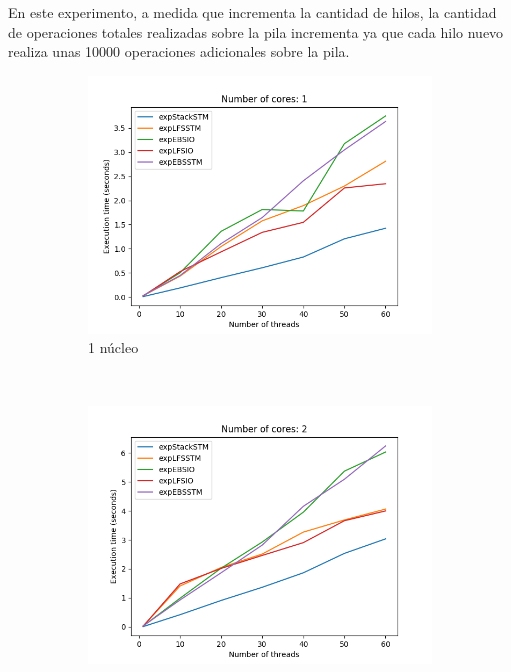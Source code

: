 En este experimento, a medida que incrementa la cantidad de hilos, la cantidad de operaciones totales realizadas sobre la pila incrementa ya que cada hilo nuevo realiza unas 10000 operaciones adicionales sobre la pila.

\begin{figure}[H]
    \centering
    \begin{subfigure}[b]{0.49\textwidth}
        \includegraphics[width=\textwidth]{images/numberOfThreads/plots/1.png}
        \caption{1 núcleo}
        \label{subfig:numberOfThreads-1core}
    \end{subfigure}
    ~
    \begin{subfigure}[b]{0.49\textwidth}
        \includegraphics[width=\textwidth]{images/numberOfThreads/plots/2.png}

\end{subfigure}
\end{figure}
